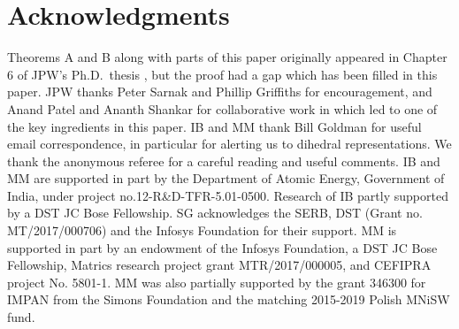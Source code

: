 \documentclass[reqno]{amsart}
\theoremstyle{plain}
\theoremstyle{definition}
\theoremstyle{remark}
\begin{document}
\section*{Acknowledgments} Theorems A and B along with parts of this paper originally appeared in Chapter 6 of 
JPW's Ph.D.~thesis \cite{whang0}, but the proof had a gap which has been filled in this paper. JPW thanks Peter 
Sarnak and Phillip Griffiths for encouragement, and Anand Patel and Ananth Shankar for collaborative work in 
\cite{psw} which led to one of the key ingredients in this paper. IB and MM thank Bill Goldman for useful email 
correspondence, in particular for alerting us to dihedral representations. We thank the anonymous referee for a 
careful reading and useful comments. IB and MM are 
supported in part by  the Department of Atomic Energy, Government of India, under project no.12-R\&D-TFR-5.01-0500. 
Research of IB partly supported by a DST JC Bose Fellowship. SG 
acknowledges the SERB, DST (Grant no. MT/2017/000706) and the Infosys Foundation for their support. 
MM is   supported in part
 by an endowment of the Infosys Foundation,
a DST JC Bose Fellowship, Matrics research project grant  MTR/2017/000005,
and CEFIPRA  project No. 5801-1. MM was also partially supported by the grant 346300 for IMPAN from the Simons Foundation 
and the matching 2015-2019 Polish MNiSW fund.
\end{document}

